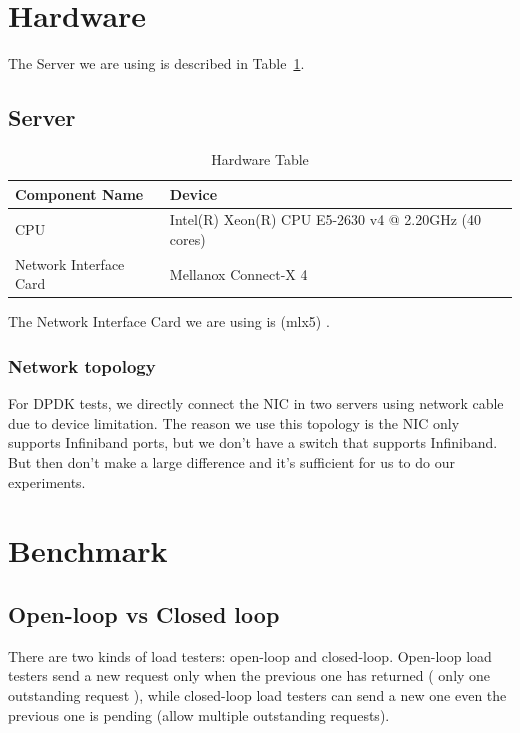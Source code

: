 \documentclass[bsc,frontabs,twoside,singlespacing,parskip,deptreport]{infthesis}     %
\begin{document}
\section{Hardware}

The Server we are using is described in  Table~\ref{tab:hardware}.


\subsection{Server}


\begin{table}[h]
\begin{tabular}{ |p{6cm}||p{6cm}|  }


 \hline
 Component Name & Device \\
 \hline
CPU & Intel(R) Xeon(R) CPU E5-2630 v4 @ 2.20GHz (40 cores) \\
 \hline
Network Interface Card & Mellanox Connect-X 4 \\
 \hline
 
 
\end{tabular}
\caption{Hardware Table}
\label{tab:hardware}

\end{table}


The Network Interface Card we are using is (mlx5) \cite{P1}.


\subsubsection{Network topology}

For DPDK tests, we directly connect the NIC in two servers using network cable due to device limitation. The reason we use this topology is the NIC only supports Infiniband ports, but we don't have a switch that supports Infiniband. But then don't make a large difference and it's sufficient for us to do our experiments.






\section{Benchmark}


\subsection{Open-loop vs Closed loop}

There are two kinds of load testers: open-loop and closed-loop. Open-loop load testers send a new request only when the previous one has returned ( only one outstanding request ), while closed-loop load testers can send a new one even the previous one is pending (allow multiple outstanding requests).
\end{document}

